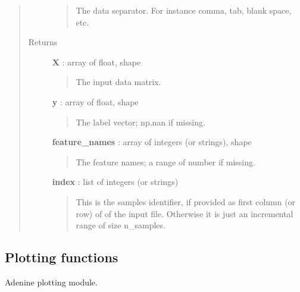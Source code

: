 \documentclass[letterpaper,10pt,english]{sphinxmanual}
\begin{document}
\begin{fulllineitems}
\begin{quote}
\begin{description}
\begin{quote}
The data separator. For instance comma, tab, blank space, etc.
\end{quote}

\item[{Returns}] \leavevmode
\textbf{X} : array of float, shape
\begin{quote}

The input data matrix.
\end{quote}

\textbf{y} : array of float, shape
\begin{quote}

The label vector; np.nan if missing.
\end{quote}

\textbf{feature\_names} : array of integers (or strings), shape
\begin{quote}

The feature names; a range of number if missing.
\end{quote}

\textbf{index} : list of integers (or strings)
\begin{quote}

This is the samples identifier, if provided as first column (or row) of
of the input file. Otherwise it is just an incremental range of size
n\_samples.
\end{quote}

\end{description}\end{quote}

\end{fulllineitems}



\subsection{Plotting functions}
\label{index:plotting-functions}\label{index:module-adenine.core.plotting}
Adenine plotting module.
\end{document}
